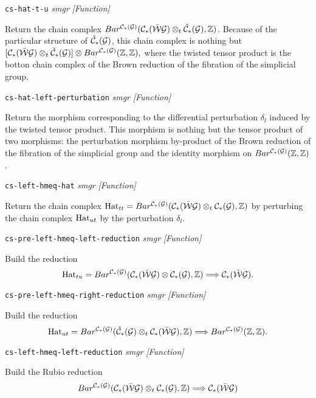 {{\leftskip=5mm
{\tt cs-hat-t-u} {\em smgr}  \hfill {\em [Function]} \par}
{\leftskip=15mm
Return the chain complex
$Bar^{{\cal C}_*({\cal G})}({\cal C}_*(\bar{\cal W}{\cal G})\otimes_t {\check{\cal C}}_*({\cal G}),{\mathbb{Z}})$. Because of
the particular structure of ${\check{\cal C}}_*({\cal G})$, this chain complex is nothing but
$[{\cal C}_*(\bar{\cal W}{\cal G})\otimes_t {\check{\cal C}}_*({\cal G})]\otimes Bar^{{\cal C}_*({\cal G})}({\mathbb{Z}},{\mathbb{Z}}),$
where the twisted tensor product is the botton chain complex of the Brown reduction
of the fibration of the simplicial group. \par}
{\leftskip=5mm
{\tt cs-hat-left-perturbation} {\em smgr}  \hfill {\em [Function]} \par}
{\leftskip=15mm
Return the morphism corresponding to the differential perturbation $\delta_l$ induced
by the twisted tensor product. This morphism is nothing but the tensor product of two
morphisms: the perturbation morphism by-product of the Brown reduction of the fibration of
the simplicial group and the identity morphism on $Bar^{{\cal C}_*({\cal G})}({\mathbb{Z}},{\mathbb{Z}})$. \par}
{\leftskip=5mm
{\tt cs-left-hmeq-hat} {\em smgr}  \hfill {\em [Function]} \par}
{\leftskip=15mm
Return the chain complex
${\rm Hat}_{tt}=Bar^{{\cal C}_*({\cal G})}({\cal C}_*(\bar{\cal W}{\cal G})\otimes_t {\cal C}_*({\cal G}),{\mathbb{Z}})$ by
perturbing the chain complex ${\rm Hat}_{ut}$ by the perturbation $\delta_l$. \par}
{\leftskip=5mm
{\tt cs-pre-left-hmeq-left-reduction} {\em smgr}  \hfill {\em [Function]} \par}
{\leftskip=15mm
Build the reduction
$${\rm Hat}_{tu}=Bar^{{\cal C}_*({\cal G})}({\cal C}_*(\bar{\cal W}{\cal G})\otimes {\cal C}_*({\cal G}),{\mathbb{Z}}) \Longrightarrow {\cal C}_*(\bar{\cal W}{\cal G}).$$
\par}
{\leftskip=5mm
{\tt cs-pre-left-hmeq-right-reduction} {\em smgr}  \hfill {\em [Function]} \par}
{\leftskip=15mm
Build the reduction
$${\rm Hat}_{ut}=Bar^{{\cal C}_*({\cal G})}({\check{\cal C}}_*({\cal G})\otimes_t {\cal C}_*(\bar{\cal W}{\cal G}),{\mathbb{Z}}) \Longrightarrow
Bar^{{\cal C}_*({\cal G})}({\mathbb{Z}}, {\mathbb{Z}}).$$ \par}
{\leftskip=5mm
{\tt cs-left-hmeq-left-reduction} {\em smgr}  \hfill {\em [Function]} \par}
{\leftskip=15mm
Build the Rubio reduction
$$Bar^{{\cal C}_*({\cal G})}({\cal C}_*(\bar{\cal W}{\cal G})\otimes_t {\cal C}_*({\cal G}),{\mathbb{Z}}) \Longrightarrow{\cal C}_*(\bar{\cal W}{\cal G})$$
}}
